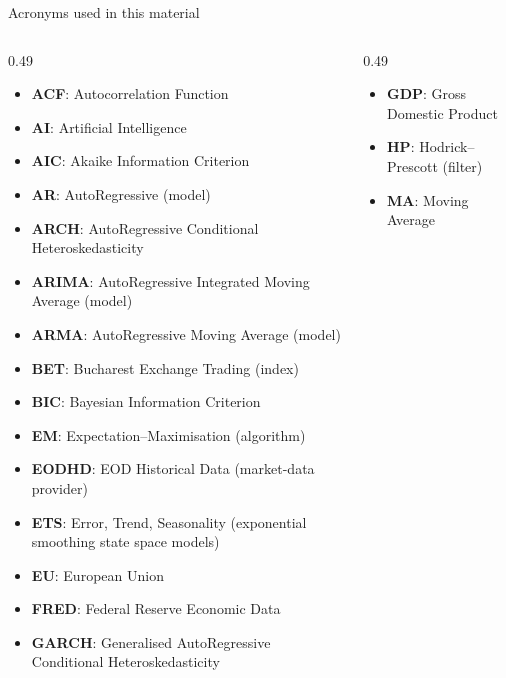 {
\begin{frame}[noframenumbering]
    \titlepage
\end{frame}
}
\begin{frame}{Acronyms used in this material}
\begin{columns}[T]
\begin{column}{0.49\textwidth}
\begin{itemize}\setlength{\itemsep}{0pt}
    \item \textbf{ACF}: Autocorrelation Function
    \item \textbf{AI}: Artificial Intelligence
    \item \textbf{AIC}: Akaike Information Criterion
    \item \textbf{AR}: AutoRegressive (model)
    \item \textbf{ARCH}: AutoRegressive Conditional Heteroskedasticity
    \item \textbf{ARIMA}: AutoRegressive Integrated Moving Average (model)
    \item \textbf{ARMA}: AutoRegressive Moving Average (model)
    \item \textbf{BET}: Bucharest Exchange Trading (index)
    \item \textbf{BIC}: Bayesian Information Criterion
    \item \textbf{EM}: Expectation–Maximisation (algorithm)
    \item \textbf{EODHD}: EOD Historical Data (market-data provider)
    \item \textbf{ETS}: Error, Trend, Seasonality (exponential smoothing state space models)
    \item \textbf{EU}: European Union
    \item \textbf{FRED}: Federal Reserve Economic Data
    \item \textbf{GARCH}: Generalised AutoRegressive Conditional Heteroskedasticity
\end{itemize}
\end{column}
\begin{column}{0.49\textwidth}
\begin{itemize}\setlength{\itemsep}{0pt}
    \item \textbf{GDP}: Gross Domestic Product
    \item \textbf{HP}: Hodrick–Prescott (filter)
    \item \textbf{MA}: Moving Average

\end{itemize}
\end{column}
\end{columns}
\end{frame}
